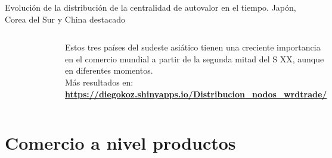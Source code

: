 \documentclass[compress]{beamer}
\begin{document}
\begin{frame}	
\small{Evolución de la distribución de la centralidad de autovalor en el tiempo. Japón, Corea del Sur y China destacado}

\begin{columns}[c] 
	\begin{figure}
		\includegraphics[scale=0.29]{1950_2000_impo_densidad_CHN_JPN_ROK_atvlr}
	\end{figure}
	
	
	\begin{flushleft}
	\small
		Estos tres países del sudeste asiático tienen una creciente importancia en el comercio mundial a partir de la segunda mitad del S XX, aunque en diferentes momentos. 
		\\
	\tiny{Más resultados en: \textbf{\url{https://diegokoz.shinyapps.io/Distribucion_nodos_wrdtrade/}}}
		
	\end{flushleft}
	
\end{columns}
\end{frame}

\section{Comercio a nivel productos}
\end{document}
